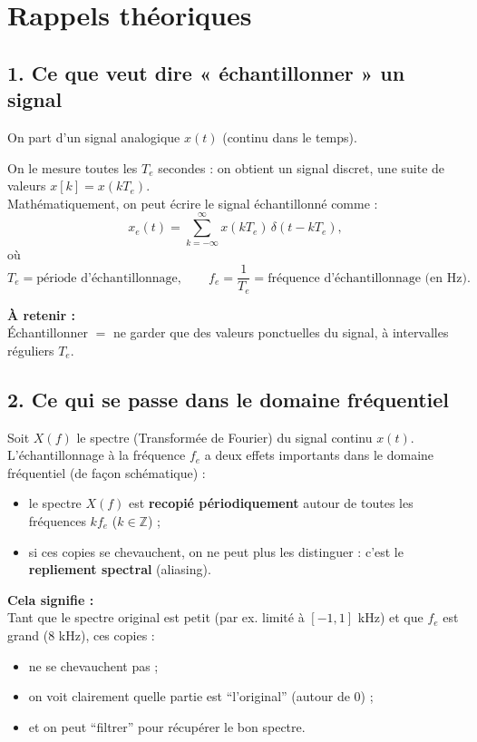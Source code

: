 
\section*{Rappels théoriques}

\subsection*{1. Ce que veut dire « échantillonner » un signal}

On part d’un signal analogique $x(t)$ (continu dans le temps).

On le mesure toutes les $T_e$ secondes : on obtient un signal discret, une suite de valeurs $x[k] = x(kT_e)$. \\

Mathématiquement, on peut écrire le signal échantillonné comme :
\[
x_e(t) = \sum_{k=-\infty}^{\infty} x(kT_e)\,\delta(t-kT_e),
\]
où 
\[
T_e = \text{période d’échantillonnage}, \qquad
f_e = \frac{1}{T_e} = \text{fréquence d’échantillonnage (en Hz)}.
\]

\textbf{À retenir :} \\
Échantillonner $=$ ne garder que des valeurs ponctuelles du signal, à intervalles réguliers $T_e$. 

\subsection*{2. Ce qui se passe dans le domaine fréquentiel}

Soit $X(f)$ le spectre (Transformée de Fourier) du signal continu $x(t)$. \\

L’échantillonnage à la fréquence $f_e$ a deux effets importants dans le domaine fréquentiel (de façon schématique) :
\begin{itemize}
    \item le spectre $X(f)$ est \textbf{recopié périodiquement} autour de toutes les fréquences $k f_e$ ($k \in \mathbb{Z}$) ;
    \item si ces copies se chevauchent, on ne peut plus les distinguer : c’est le \textbf{repliement spectral} (aliasing). \\
\end{itemize}

\textbf{Cela signifie :} \\
Tant que le spectre original est petit (par ex. limité à $[-1,1]$ kHz) et que $f_e$ est grand (8 kHz), ces copies :
\begin{itemize}
    \item ne se chevauchent pas ;
    \item on voit clairement quelle partie est “l’original” (autour de 0) ;
    \item et on peut “filtrer” pour récupérer le bon spectre. \\
\end{itemize}

